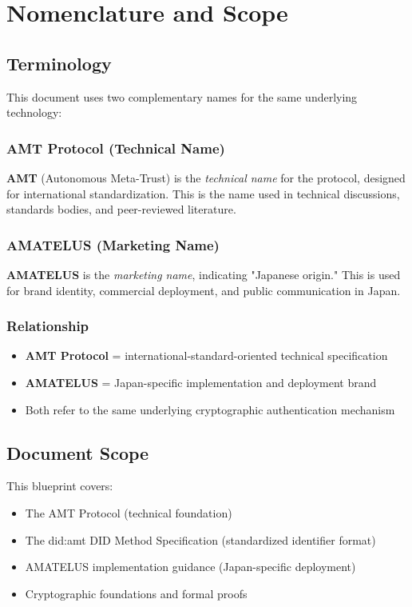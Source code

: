 \chapter{Nomenclature and Scope}

\section{Terminology}

This document uses two complementary names for the same underlying technology:

\subsection{AMT Protocol (Technical Name)}

\textbf{AMT} (Autonomous Meta-Trust) is the \emph{technical name} for the protocol, designed for international standardization. This is the name used in technical discussions, standards bodies, and peer-reviewed literature.

\subsection{AMATELUS (Marketing Name)}

\textbf{AMATELUS} is the \emph{marketing name}, indicating "Japanese origin." This is used for brand identity, commercial deployment, and public communication in Japan.

\subsection{Relationship}

\begin{itemize}
  \item \textbf{AMT Protocol} = international-standard-oriented technical specification
  \item \textbf{AMATELUS} = Japan-specific implementation and deployment brand
  \item Both refer to the same underlying cryptographic authentication mechanism
\end{itemize}

\section{Document Scope}

This blueprint covers:
\begin{itemize}
  \item The AMT Protocol (technical foundation)
  \item The did:amt DID Method Specification (standardized identifier format)
  \item AMATELUS implementation guidance (Japan-specific deployment)
  \item Cryptographic foundations and formal proofs
\end{itemize}


